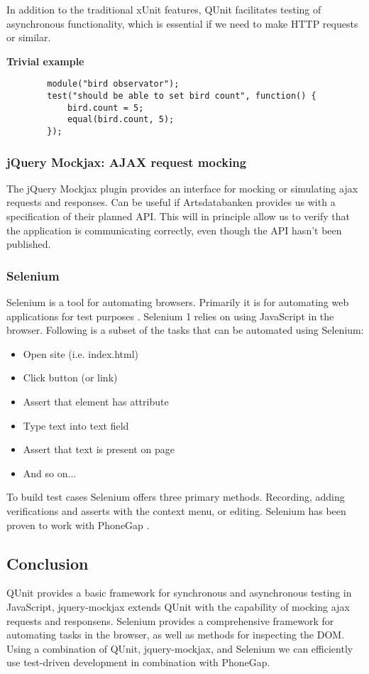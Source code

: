 	In addition to the traditional xUnit features, QUnit facilitates testing of
	asynchronous functionality, which is essential if we need to make HTTP
	requests or similar.

	\textbf{Trivial example}

	\begin{lstlisting}
		module("bird observator");
		test("should be able to set bird count", function() {
			bird.count = 5;
			equal(bird.count, 5);
		});
	\end{lstlisting}

\subsubsection{jQuery Mockjax: AJAX request mocking}

	The jQuery Mockjax plugin provides an interface for mocking or simulating
	ajax requests and responses. \cite{github:jquery-mockjax} Can be useful if Artsdatabanken provides us
	with a specification of their planned API. This will in principle allow us
	to verify that the application is communicating correctly, even though the
	API hasn't been published.

\subsubsection{Selenium}

	Selenium is a tool for automating browsers. Primarily it is for automating
	web applications for test purposes \cite{seleniumhq:home}. Selenium 1 relies
	on using JavaScript in the browser. Following is a subset of the tasks that
	can be automated using Selenium:

	\begin{itemize}
		\item Open site (i.e. index.html)
		\item Click button (or link)
		\item Assert that element has attribute
		\item Type text into text field
		\item Assert that text is present on page
		\item And so on...
	\end{itemize}

	To build test cases Selenium offers three primary methods. Recording, adding
	verifications and asserts with the context menu, or editing. Selenium has
	been proven to work with PhoneGap \cite{phonegap:automatic-test-cases}.

\subsection{Conclusion}

	QUnit provides a basic framework for synchronous and asynchronous testing in
	JavaScript, jquery-mockjax extends QUnit with the capability of mocking ajax
	requests and responsens. Selenium provides a comprehensive framework for
	automating tasks in the browser, as well as methods for inspecting the DOM.
	Using a combination of QUnit, jquery-mockjax, and Selenium we can
	efficiently use test-driven development in combination with PhoneGap.
